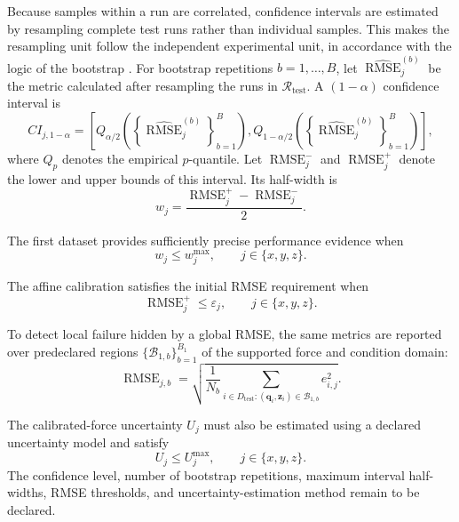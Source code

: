 \documentclass[11pt,a4paper]{article}
\begin{document}
Because samples within a run are correlated, confidence intervals are
estimated by resampling complete test runs rather than individual samples.
This makes the resampling unit follow the independent experimental unit, in
accordance with the logic of the bootstrap \cite{efron1993}. For bootstrap
repetitions $b=1,\ldots,B$, let
$\widehat{\operatorname{RMSE}}_{j}^{(b)}$ be the metric calculated after
resampling the runs in $\mathcal{R}_{\mathrm{test}}$. A
$(1-\alpha)$ confidence interval is
\begin{equation}
    CI_{j,1-\alpha}
    =
    \left[
        Q_{\alpha/2}
        \left(
            \left\{
                \widehat{\operatorname{RMSE}}_{j}^{(b)}
            \right\}_{b=1}^{B}
        \right),
        Q_{1-\alpha/2}
        \left(
            \left\{
                \widehat{\operatorname{RMSE}}_{j}^{(b)}
            \right\}_{b=1}^{B}
        \right)
    \right],
\end{equation}
where $Q_p$ denotes the empirical $p$-quantile. Let
$\operatorname{RMSE}_{j}^{-}$ and $\operatorname{RMSE}_{j}^{+}$ denote the
lower and upper bounds of this interval. Its half-width is
\begin{equation}
    w_j
    =
    \frac{
        \operatorname{RMSE}_{j}^{+}
        -
        \operatorname{RMSE}_{j}^{-}
    }{2}.
\end{equation}

The first dataset provides sufficiently precise performance evidence when
\begin{equation}
    w_j\leq w_j^{\max},
    \qquad
    j\in\{x,y,z\}.
\end{equation}

The affine calibration satisfies the initial RMSE requirement when
\begin{equation}
    \operatorname{RMSE}_{j}^{+}
    \leq
    \varepsilon_j,
    \qquad
    j\in\{x,y,z\}.
\end{equation}

To detect local failure hidden by a global RMSE, the same metrics are reported
over predeclared regions
$\{\mathcal{B}_{1,b}\}_{b=1}^{B_1}$ of the supported force and condition
domain:
\begin{equation}
    \operatorname{RMSE}_{j,b}
    =
    \sqrt{
        \frac{1}{N_b}
        \sum_{
            i\in D_{\mathrm{test}}
            :
            (\mathbf{q}_i,\mathbf{z}_i)\in\mathcal{B}_{1,b}
        }
        e_{i,j}^{2}
    }.
\end{equation}

The calibrated-force uncertainty $U_j$ must also be estimated using a declared
uncertainty model and satisfy
\begin{equation}
    U_j\leq U_j^{\max},
    \qquad
    j\in\{x,y,z\}.
\end{equation}
The confidence level, number of bootstrap repetitions, maximum interval
half-widths, RMSE thresholds, and uncertainty-estimation method remain to be
declared.
\end{document}
